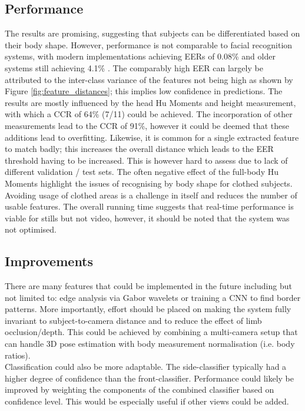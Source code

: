 \documentclass[conference]{IEEEtran}
\begin{document}
\subsection{Performance}
\noindent The results are promising, suggesting that subjects can be differentiated based on their body shape. However, performance is not comparable to facial recognition systems, with modern implementations achieving EERs of 0.08\% and older systems still achieving 4.1\% \cite{facial_rec}. The comparably high EER can largely be attributed to the inter-class variance of the features not being high as shown by Figure \ref{fig:feature_distances}; this implies low confidence in predictions. The results are mostly influenced by the head Hu Moments and height measurement, with which a CCR of  64\% (7/11) could be achieved. The incorporation of other measurements lead to the CCR of 91\%, however it could be deemed that these additions lead to overfitting. Likewise, it is common for a single extracted feature to match badly; this increases the overall distance which leads to the EER threshold having to be increased. This is however hard to assess due to lack of different validation / test sets. The often negative effect of the full-body Hu Moments highlight the issues of recognising by body shape for clothed subjects. Avoiding usage of clothed areas is a challenge in itself and reduces the number of usable features. The overall running time suggests that real-time performance is viable for stills but not video, however, it should be noted that the system was not optimised. \\

\subsection{Improvements}
\noindent There are many features that could be implemented in the future including but not limited to: edge analysis via Gabor wavelets or training a CNN to find border patterns. More importantly, effort should be placed on making the system fully invariant to subject-to-camera distance and to reduce the effect of limb occlusion/depth. This could be achieved by combining a multi-camera setup that can handle 3D pose estimation with body measurement normalisation (i.e. body ratios).\\

\noindent Classification could also be more adaptable. The side-classifier typically had a higher degree of confidence than the front-classifier. Performance could likely be improved by weighting the components of the combined classifier based on confidence level. This would be especially useful if other views could be added.
\end{document}
